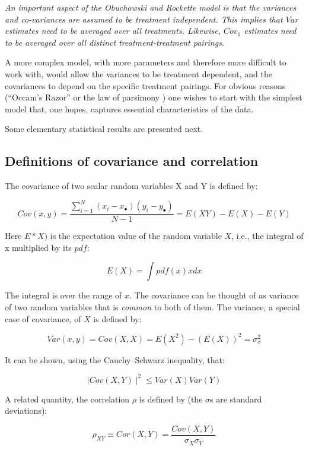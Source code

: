 \documentclass[
]{book}
\begin{document}
\emph{An important aspect of the Obuchowski and Rockette model is that the variances and co-variances are assumed to be treatment independent. This implies that \(Var\) estimates need to be averaged over all treatments. Likewise, \(Cov_1\) estimates need to be averaged over all distinct treatment-treatment pairings.}

A more complex model, with more parameters and therefore more difficult to work with, would allow the variances to be treatment dependent, and the covariances to depend on the specific treatment pairings. For obvious reasons (``Occam's Razor'' or the law of parsimony ) one wishes to start with the simplest model that, one hopes, captures essential characteristics of the data.

Some elementary statistical results are presented next.

\hypertarget{definitions-of-covariance-and-correlation}{%
\subsection{Definitions of covariance and correlation}\label{definitions-of-covariance-and-correlation}}

The covariance of two scalar random variables X and Y is defined by:

\begin{equation}
Cov(x,y) =\frac{\sum_{i=1}^{N}(x_{i}-x_{\bullet})(y_{i}-y_{\bullet})}{N-1}=E(XY)-E(X)-E(Y)
\label{eq:DefinitionCovariance}
\end{equation}

Here \(E*X)\) is the expectation value of the random variable \(X\), i.e., the integral of x multiplied by its \(pdf\):

\[E(X)=\int pdf(x) x dx\]

The integral is over the range of \(x\). The covariance can be thought of as variance of two random variables that is \emph{common} to both of them. The variance, a special case of covariance, of \(X\) is defined by:

\[Var(x,y) =Cov(X,X)=E(X^2)-(E(X))^2=\sigma_x^2\]

It can be shown, using the Cauchy--Schwarz inequality, that:

\[\mid Cov(X,Y) \mid^2 \le Var(X)Var(Y)\]

A related quantity, the correlation \(\rho\) is defined by (the \(\sigma\)s are standard deviations):

\[\rho_{XY} \equiv Cor(X,Y)=\frac{Cov(X,Y)}{\sigma_X \sigma_Y}\]
\end{document}
